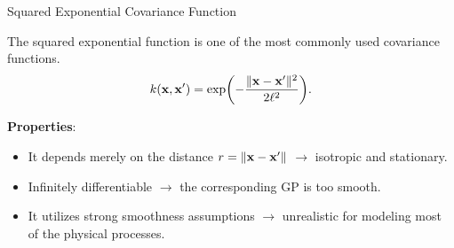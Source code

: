 \begin{frame}[c]{Squared Exponential Covariance Function}

The squared exponential function is one of the most commonly used covariance functions.
$$
k(\mathbf{x}, \mathbf{x}^\prime) = \exp\biggl(- \frac{\|\mathbf{x} - \mathbf{x}^\prime\|^2}{2\ell^2}\biggr).
$$

\textbf{Properties}:
\begin{itemize}
\item[\faLightbulbO] It depends merely on the distance $r = \|\mathbf{x} - \mathbf{x}^\prime\|$ $\to$ isotropic and stationary.\lz
\item[\faLightbulbO] Infinitely differentiable $\to$ the corresponding GP is too smooth.\lz
\item[\faLightbulbO] It utilizes strong smoothness assumptions $\to$ unrealistic for modeling most of the physical processes.
\end{itemize}

\end{frame}
